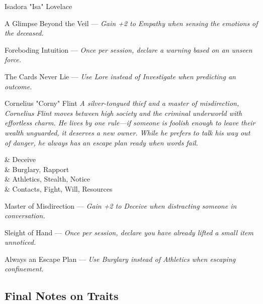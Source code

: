 \begin{multicols}{2}
\begin{NPC}{Isadora "Isa" Lovelace}
	\begin{TraitsBox}
	  \item[A Glimpse Beyond the Veil] — \emph{Gain +2 to Empathy when sensing the emotions of the deceased.}
	  \item[Foreboding Intuition] — \emph{Once per session, declare a warning based on an unseen force.}
	  \item[The Cards Never Lie] — \emph{Use Lore instead of Investigate when predicting an outcome.}
	\end{TraitsBox}
  \end{NPC}
  

  \begin{NPC}{Cornelius "Corny" Flint}
	\emph{A silver-tongued thief and a master of misdirection, Cornelius Flint moves between high society and the criminal underworld with effortless charm. He lives by one rule—if someone is foolish enough to leave their wealth unguarded, it deserves a new owner. While he prefers to talk his way out of danger, he always has an escape plan ready when words fail.}
  
	\vspace{0.5\baselineskip}

	\begin{SkillsBox}
		\Expert & Deceive \\
		\Skilled & Burglary, Rapport \\
		\Novice & Athletics, Stealth, Notice \\
		\Untrained & Contacts, Fight, Will, Resources \\
	\end{SkillsBox}
  
	\begin{TraitsBox}
	  \item[Master of Misdirection] — \emph{Gain +2 to Deceive when distracting someone in conversation.}
	  \item[Sleight of Hand] — \emph{Once per session, declare you have already lifted a small item unnoticed.}
	  \item[Always an Escape Plan] — \emph{Use Burglary instead of Athletics when escaping confinement.}
	\end{TraitsBox}
	\end{NPC}
  
  \end{multicols}

\EndBoxPage


 
\subsection{Final Notes on Traits}

